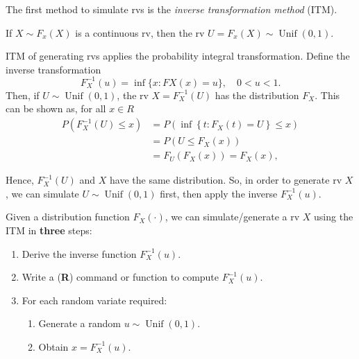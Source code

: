 \documentclass[
  letterpaper,
  DIV=11,
  numbers=noendperiod]{scrreprt}
\providecommand{\tightlist}{%
  \setlength{\itemsep}{0pt}\setlength{\parskip}{0pt}}
\begin{document}
The first method to simulate rvs is the \emph{inverse transformation
method} (ITM).

If \(X\sim F_x(X)\) is a continuous rv, then the rv
\(U = F_x(X) \sim \operatorname{Unif}(0,1)\).

ITM of generating rvs applies the probability integral transformation.
Define the inverse transformation
\[ F^{−1}_X(u) = \inf\{x : FX (x) = u\},\quad  0 < u < 1.\] Then, if
\(U \sim \operatorname{Unif}(0,1)\), the rv \(X = F^{−1}_X(U)\) has the
distribution \(F_X\). This can be shown as, for all \(x \in R\)
\begin{align}
P\left(F_X^{-1}(U) \leq x\right) & =P\left(\inf \left\{t: F_X(t)=U\right\} \leq x\right) \\
& =P\left(U \leq F_X(x)\right) \\
& =F_U\left(F_X(x)\right)=F_X(x),
\end{align}

Hence, \(F_X^{-1}(U)\) and \(X\) have the same distribution. So, in
order to generate rv \(X\), we can simulate
\(U\sim \operatorname{Unif}(0,1)\) first, then apply the inverse
\(F_X^{-1}(u)\).

\begin{tcolorbox}[enhanced jigsaw, colframe=quarto-callout-note-color-frame, coltitle=black, left=2mm, colback=white, titlerule=0mm, breakable, rightrule=.15mm, colbacktitle=quarto-callout-note-color!10!white, toptitle=1mm, bottomtitle=1mm, opacityback=0, bottomrule=.15mm, title=\textcolor{quarto-callout-note-color}{\faInfo}\hspace{0.5em}{Procedure with inverse transformation method}, arc=.35mm, toprule=.15mm, leftrule=.75mm, opacitybacktitle=0.6]

Given a distribution function \(F_X(\cdot)\), we can simulate/generate a
rv \(X\) using the ITM in \textbf{three} steps:

\begin{enumerate}
\def\labelenumi{\arabic{enumi}.}
\item
  Derive the inverse function \(F_X^{-1}(u)\).
\item
  Write a (\textbf{R}) command or function to compute \(F_X^{-1}(u)\).
\item
  For each random variate required:

  \begin{enumerate}
  \def\labelenumii{\roman{enumii})}
  \tightlist
  \item
    Generate a random \(u\sim \operatorname{Unif}(0,1)\).
  \item
    Obtain \(x = F_X^{-1}(u)\).
  \end{enumerate}
\end{enumerate}

\end{tcolorbox}
\end{document}
